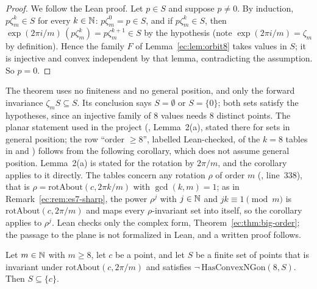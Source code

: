\begin{proof}
We follow the Lean proof. Let $p\in S$ and suppose $p\ne0$. By induction, $p\zeta_m^k\in S$ for every $k\in\mathbb N$:
$p\zeta_m^0=p\in S$, and if $p\zeta_m^k\in S$, then $\exp(2\pi i/m)\,(p\zeta_m^k)=p\zeta_m^{k+1}\in S$ by the hypothesis
(note $\exp(2\pi i/m)=\zeta_m$ by definition). Hence the family $F$ of Lemma~\ref{ec:lem:orbit8} takes values in $S$; it
is injective and convex independent by that lemma, contradicting the assumption. So $p=0$.
\end{proof}

\begin{remark}\label{ec:rem:big-order}
The theorem uses no finiteness and no general position, and only the forward invariance $\zeta_mS\subseteq S$. Its
conclusion says $S=\emptyset$ or $S=\{0\}$; both sets satisfy the hypotheses, since an injective family of $8$ values
needs $8$ distinct points. The planar statement used in the project (, Lemma~2(a),
stated there for sets in general position; the row ``order $\ge8$'', labelled Lean-checked, of the $k=8$ tables in
 and ) follows from the following corollary, which
does not assume general position. Lemma~2(a) is stated for the rotation by $2\pi/m$, and the corollary applies to it
directly. The tables concern any rotation $\rho$ of order $m$ (, line~338),
that is $\rho=\mathrm{rotAbout}(c,2\pi k/m)$ with $\gcd(k,m)=1$; as in Remark~\ref{ec:rem:es7-sharp}, the power
$\rho^j$ with $j\in\mathbb N$ and $jk\equiv1\pmod m$ is $\mathrm{rotAbout}(c,2\pi/m)$ and maps every $\rho$-invariant set
into itself, so the corollary applies to $\rho^j$. Lean checks only the complex form, Theorem~\ref{ec:thm:big-order};
the passage to the plane is not formalized in Lean, and a written proof follows.
\end{remark}

\begin{corollary}\label{ec:cor:planar}
Let $m\in\mathbb N$ with $m\ge8$, let $c$ be a point, and let $S$ be a finite set of points that is invariant under
$\mathrm{rotAbout}(c,2\pi/m)$ and satisfies $\neg\,\mathrm{HasConvexNGon}(8,S)$. Then $S\subseteq\{c\}$.
\end{corollary}

